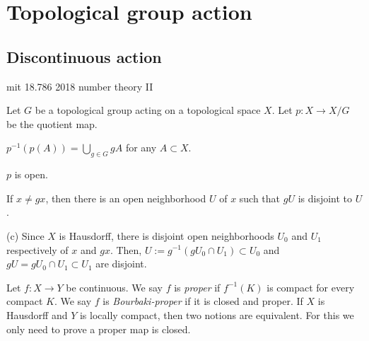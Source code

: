 \documentclass[a4paper]{article}
\begin{document}
\tableofcontents







\newpage
\section{Topological group action}
\subsection{Discontinuous action}
mit 18.786 2018 number theory II

\begin{prb}
Let $G$ be a topological group acting on a topological space $X$.
Let $p:X\to X/G$ be the quotient map.

\begin{parts}
\item $p^{-1}(p(A))=\bigcup_{g\in G}gA$ for any $A\subset X$.
\item $p$ is open.
\item If $x\ne gx$, then there is an open neighborhood $U$ of $x$ such that $gU$ is disjoint to $U$.
\end{parts}
\end{prb}
\begin{pf}
(c)
Since $X$ is Hausdorff, there is disjoint open neighborhoods $U_0$ and $U_1$ respectively of $x$ and $gx$.
Then, $U:=g^{-1}(gU_0\cap U_1)\subset U_0$ and $gU=gU_0\cap U_1\subset U_1$ are disjoint.
\end{pf}

\begin{prb}
Let $f:X\to Y$ be continuous.
We say $f$ is \emph{proper} if $f^{-1}(K)$ is compact for every compact $K$.
We say $f$ is \emph{Bourbaki-proper} if it is closed and proper.
If $X$ is Hausdorff and $Y$ is locally compact, then two notions are equivalent.
For this we only need to prove a proper map is closed.
\end{prb}
\begin{pf}

\end{pf}
\end{document}
